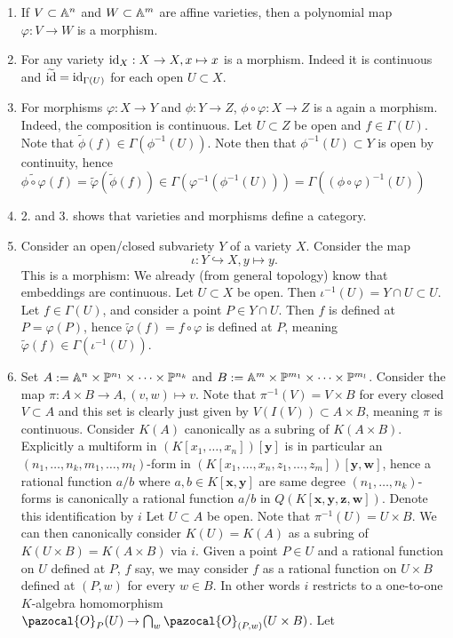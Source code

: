     \begin{example}
        \begin{enumerate}
            \item If $V\subset \mathbb{A}^n$ and $W\subset \mathbb{A}^m$ are affine varieties, then a polynomial map $\varphi: V\rightarrow W$ is a morphism. 
            \item For any variety $\mathrm{id}_X: X\rightarrow X, x\mapsto x$ is a morphism. Indeed it is continuous and $\widetilde{\mathrm{id}} = \mathrm{id}_{\Gamma(U)}$ for each open $U\subset X$. 
            \item For morphisms $\varphi : X\rightarrow Y$ and $\phi: Y \rightarrow Z$, $\phi \circ\varphi : X\rightarrow Z$ is a again a morphism. Indeed, the composition is continuous. Let $U\subset Z$ be open and $f\in \Gamma(U)$. Note that $\widetilde{\phi}(f)\in \Gamma\left(\phi^{-1}(U)\right)$. Note then that $\phi^{-1}(U)\subset Y$ is open by continuity, hence $\widetilde{\phi\circ \varphi}(f)= \widetilde{\varphi}(\widetilde{\phi}(f))\in \Gamma\left(\varphi^{-1}\left(\phi^{-1}\left(U\right)\right)\right)= \Gamma\left(\left(\phi\circ \varphi\right)^{-1}(U)\right)$ 
            \item 2. and 3. shows that varieties and morphisms define a category.
            \item Consider an open/closed subvariety $Y$ of a variety $X$. Consider the map 
            $$\iota : Y\hookrightarrow X, y\mapsto y.$$
            This is a morphism: We already (from general topology) know that embeddings are continuous. Let $U\subset X$ be open. Then $\iota^{-1}(U)=Y\cap U\subset U$. Let $f\in \Gamma(U)$, and consider a point $P \in Y\cap U$. Then $f$ is defined at $P=\varphi(P)$, hence $\widetilde{\varphi}(f)=f\circ \varphi$ is defined at $P$, meaning $\widetilde{\varphi}(f)\in \Gamma\left(\iota^{-1}(U)\right)$.
            \item Set $A:=\mathbb{A}^n\times \mathbb{P}^{n_1}\times \cdots \times \mathbb{P}^{n_k}$ and $B:= \mathbb{A}^m\times \mathbb{P}^{m_1}\times \cdots \times \mathbb{P}^{m_l}$. Consider the map $\pi : A\times B \rightarrow A, (v,w)\mapsto v$. Note that $\pi^{-1}(V)= V\times B$ for every closed $V\subset A$ and this set is clearly just given by $V(I(V))\subset A\times B$, meaning $\pi$ is continuous. Consider $K(A)$ canonically as a subring of $K(A\times B)$. Explicitly a multiform in $(K[x_1,\dots,x_n])[\mathbf{y}]$ is in particular an $(n_1,\dots,n_k,m_1,\dots,m_l)$-form in $(K[x_1,\dots,x_n,z_1,\dots,z_m])[\mathbf{y},\mathbf{w}]$, hence a rational function $a/b$ where $a,b\in K[\mathbf{x},\mathbf{y}]$ are same degree $(n_1,\dots,n_k)$-forms is canonically a rational function $a/b$ in $Q(K[\mathbf{x},\mathbf{y},\mathbf{z},\mathbf{w}])$. Denote this identification by $i$ Let $U\subset A$ be open. Note that $\pi^{-1}(U)=U\times B$. We can then canonically consider $K(U)=K(A)$ as a subring of $K(U\times B)=K(A\times B)$ via $i$. Given a point $P\in U$ and a rational function on $U$ defined at $P$, $f$ say, we may consider $f$ as a rational function on $U\times B$ defined at $(P,w)$ for every $w\in B$. In other words $i$ restricts to a one-to-one $K$-algebra homomorphism $\pazocal{O}_P(U) \rightarrow \bigcap_{w} \pazocal{O}_{(P,w)}(U\times B)$. Let 

\end{enumerate}
\end{example}
